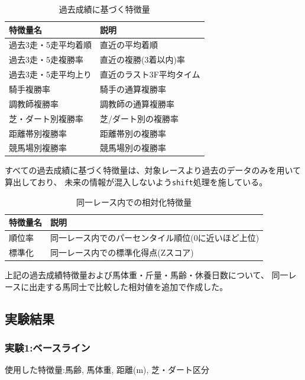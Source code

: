 \documentclass[dvipdfmx, a4paper, 11pt, titlepage]{jsarticle}
\begin{document}
\begin{table}[H]
  \centering
  \caption{過去成績に基づく特徴量}
  \label{tab:past_performance_features}
  \begin{tabular}{ll}
    \hline
    特徴量名 & 説明 \\
    \hline
    過去3走・5走平均着順 & 直近の平均着順 \\
    過去3走・5走複勝率 & 直近の複勝(3着以内)率 \\
    過去3走・5走平均上り & 直近のラスト3F平均タイム \\
    騎手複勝率 & 騎手の通算複勝率 \\
    調教師複勝率 & 調教師の通算複勝率 \\
    芝・ダート別複勝率 & 芝/ダート別の複勝率 \\
    距離帯別複勝率 & 距離帯別の複勝率 \\
    競馬場別複勝率 & 競馬場別の複勝率 \\
    \hline
  \end{tabular}
\end{table}

すべての過去成績に基づく特徴量は、対象レースより過去のデータのみを用いて算出しており、
未来の情報が混入しないよう\texttt{shift}処理を施している。

\begin{table}[H]
  \centering
  \caption{同一レース内での相対化特徴量}
  \label{tab:relative_features}
  \begin{tabular}{ll}
    \hline
    特徴量名 & 説明 \\
    \hline
    順位率 & 同一レース内でのパーセンタイル順位(0に近いほど上位) \\
    標準化 & 同一レース内での標準化得点(Zスコア) \\
    \hline
  \end{tabular}
\end{table}
上記の過去成績特徴量および馬体重・斤量・馬齢・休養日数について、
同一レースに出走する馬同士で比較した相対値を追加で作成した。
\subsection{実験結果}

\subsubsection{実験1:ベースライン}

使用した特徴量:馬齢, 馬体重, 距離(m), 芝・ダート区分
\end{document}
